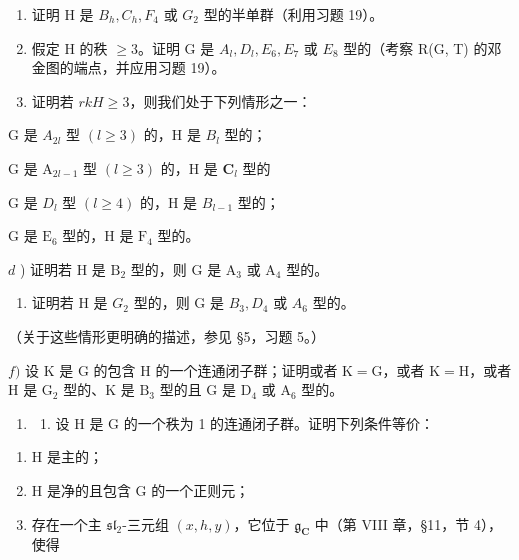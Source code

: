 \begin{enumerate}
\def\labelenumi{\alph{enumi})}
\item
  证明 H 是 \(B_{h}, C_{h}, F_{4}\) 或 \(G_{2}\) 型的半单群（利用习题 19）。
\item
  假定 H 的秩 \(\geq 3\)。证明 G 是 \(A_{l}, D_{l}, E_{6}, E_{7}\) 或 \(E_{8}\) 型的（考察 R(G, T) 的邓金图的端点，并应用习题 19）。
\item
  证明若 \(rkH \geq 3\)，则我们处于下列情形之一：
\end{enumerate}

G 是 \(A_{2l}\) 型 \((l \geq 3)\) 的，H 是 \(B_{l}\) 型的；

G 是 \(\mathrm{A}_{2l - 1}\) 型 \((l\geq 3)\) 的，H 是 \(\mathbf{C}_l\) 型的

G 是 \(D_{l}\) 型 \((l \geq 4)\) 的，H 是 \(B_{l-1}\) 型的；

G 是 \(\mathrm{E}_6\) 型的，H 是 \(\mathrm{F}_4\) 型的。

\(d\) ) 证明若 H 是 \(\mathrm{B}_2\) 型的，则 G 是 \(\mathrm{A}_3\) 或 \(\mathrm{A}_4\) 型的。

\begin{enumerate}
\def\labelenumi{\alph{enumi})}
\setcounter{enumi}{4}
\tightlist
\item
  证明若 H 是 \(G_{2}\) 型的，则 G 是 \(B_{3}, D_{4}\) 或 \(A_{6}\) 型的。
\end{enumerate}

（关于这些情形更明确的描述，参见 §5，习题 5。）

\(f)\) 设 \(\mathrm{K}\) 是 \(\mathrm{G}\) 的包含 \(\mathrm{H}\) 的一个连通闭子群；证明或者 \(\mathrm{K} = \mathrm{G}\)，或者 \(\mathrm{K} = \mathrm{H}\)，或者 \(\mathrm{H}\) 是 \(\mathrm{G}_2\) 型的、\(\mathrm{K}\) 是 \(\mathrm{B}_3\) 型的且 \(\mathrm{G}\) 是 \(\mathrm{D}_4\) 或 \(\mathrm{A}_6\) 型的。

\begin{enumerate}
\def\labelenumi{\arabic{enumi})}
\setcounter{enumi}{20}
\tightlist
\item
  \begin{enumerate}
  \def\labelenumii{\alph{enumii})}
  \tightlist
  \item
    设 H 是 G 的一个秩为 1 的连通闭子群。证明下列条件等价：
  \end{enumerate}
\end{enumerate}

\begin{enumerate}
\def\labelenumi{(\roman{enumi})}
\item
  H 是主的；
\item
  H 是净的且包含 G 的一个正则元；
\item
  存在一个主 \(\mathfrak{sl}_2\)-三元组 \((x,h,y)\)，它位于 \(\mathfrak{g}_{\mathbf{C}}\) 中（第 VIII 章，§11，节 4），使得
\end{enumerate}


